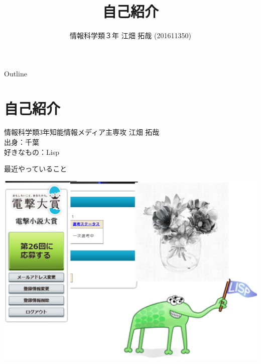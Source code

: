 \documentclass[dvipdfmx,10pt,presentation]{beamer}
\author{情報科学類３年 江畑 拓哉 (201611350)}
\date{}
\title{自己紹介}
\begin{document}
\maketitle
\begin{frame}{Outline}
\tableofcontents
\end{frame}

\section{自己紹介}
\label{sec:org5943371}
\begin{frame}[label={sec:org6a35977}]{}
情報科学類3年知能情報メディア主専攻 江畑 拓哉\\
出身：千葉\\
好きなもの：Lisp\\
\begin{block}{最近やっていること}
\begin{center}
\includegraphics[width=0.7\linewidth]{./res.png}
\end{center}
\end{block}
\end{frame}
\end{document}
